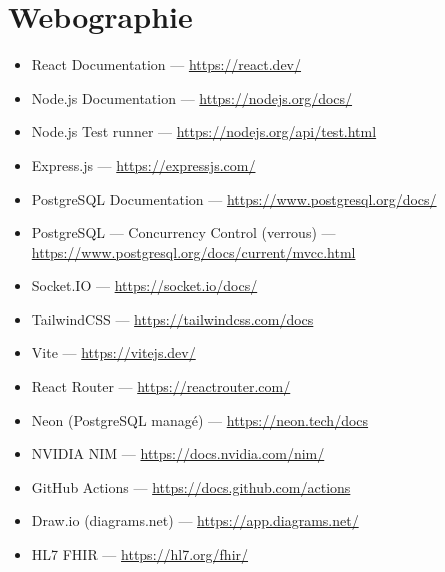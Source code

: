 \chapter*{Webographie}

\begin{itemize}
    \item React Documentation — \url{https://react.dev/}
    \item Node.js Documentation — \url{https://nodejs.org/docs/}
    \item Node.js Test runner — \url{https://nodejs.org/api/test.html}
    \item Express.js — \url{https://expressjs.com/}
    \item PostgreSQL Documentation — \url{https://www.postgresql.org/docs/}
    \item PostgreSQL — Concurrency Control (verrous) — \url{https://www.postgresql.org/docs/current/mvcc.html}
    \item Socket.IO — \url{https://socket.io/docs/}
    \item TailwindCSS — \url{https://tailwindcss.com/docs}
    \item Vite — \url{https://vitejs.dev/}
    \item React Router — \url{https://reactrouter.com/}
    \item Neon (PostgreSQL managé) — \url{https://neon.tech/docs}
    \item NVIDIA NIM — \url{https://docs.nvidia.com/nim/}
    \item GitHub Actions — \url{https://docs.github.com/actions}
    \item Draw.io (diagrams.net) — \url{https://app.diagrams.net/}
    \item HL7 FHIR — \url{https://hl7.org/fhir/}
\end{itemize}
